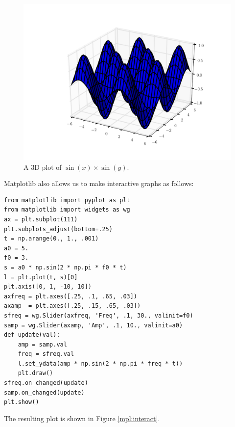 \begin{figure}
\includegraphics[width=\textwidth]{3dplot.pdf}
\caption{A 3D plot of $\sin\left(x\right)\times\sin\left(y\right)$.}
\label{mpl:3dplot}
\end{figure}

Matplotlib also allows us to make interactive graphs as follows:


\begin{lstlisting}
from matplotlib import pyplot as plt
from matplotlib import widgets as wg
ax = plt.subplot(111)
plt.subplots_adjust(bottom=.25)
t = np.arange(0., 1., .001)
a0 = 5.
f0 = 3.
s = a0 * np.sin(2 * np.pi * f0 * t)
l = plt.plot(t, s)[0]
plt.axis([0, 1, -10, 10])
axfreq = plt.axes([.25, .1, .65, .03])
axamp  = plt.axes([.25, .15, .65, .03])
sfreq = wg.Slider(axfreq, 'Freq', .1, 30., valinit=f0)
samp = wg.Slider(axamp, 'Amp', .1, 10., valinit=a0)
def update(val):
    amp = samp.val
    freq = sfreq.val
    l.set_ydata(amp * np.sin(2 * np.pi * freq * t))
    plt.draw()
sfreq.on_changed(update)
samp.on_changed(update)
plt.show()
\end{lstlisting}
The resulting plot is shown in Figure \ref{mpl:interact}.

